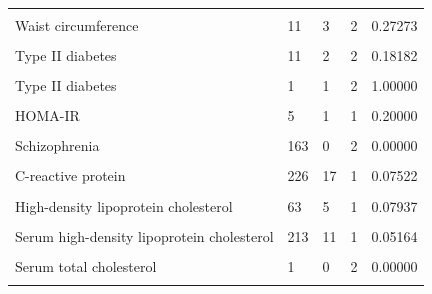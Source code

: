 \documentclass[11pt,oneside]{bristolthesis}
\begin{document}
\begin{table}
{\begin{tabular}[t]{lllll}
\cellcolor{gray!6}{Waist circumference} & \cellcolor{gray!6}{172} & \cellcolor{gray!6}{6} & \cellcolor{gray!6}{2} & \cellcolor{gray!6}{0.03488}\\
Waist circumference & 11 & 3 & 2 & 0.27273\\
\cellcolor{gray!6}{Waist circumference} & \cellcolor{gray!6}{2} & \cellcolor{gray!6}{1} & \cellcolor{gray!6}{2} & \cellcolor{gray!6}{0.50000}\\
\addlinespace
Type II diabetes & 11 & 2 & 2 & 0.18182\\
\cellcolor{gray!6}{Type II diabetes} & \cellcolor{gray!6}{6} & \cellcolor{gray!6}{0} & \cellcolor{gray!6}{2} & \cellcolor{gray!6}{0.00000}\\
Type II diabetes & 1 & 1 & 2 & 1.00000\\
\cellcolor{gray!6}{HOMA-IR} & \cellcolor{gray!6}{1} & \cellcolor{gray!6}{1} & \cellcolor{gray!6}{1} & \cellcolor{gray!6}{1.00000}\\
HOMA-IR & 5 & 1 & 1 & 0.20000\\
\addlinespace
\cellcolor{gray!6}{Schizophrenia} & \cellcolor{gray!6}{3} & \cellcolor{gray!6}{0} & \cellcolor{gray!6}{2} & \cellcolor{gray!6}{0.00000}\\
Schizophrenia & 163 & 0 & 2 & 0.00000\\
\cellcolor{gray!6}{C-reactive protein} & \cellcolor{gray!6}{3} & \cellcolor{gray!6}{3} & \cellcolor{gray!6}{1} & \cellcolor{gray!6}{1.00000}\\
C-reactive protein & 226 & 17 & 1 & 0.07522\\
\cellcolor{gray!6}{High-density lipoprotein cholesterol} & \cellcolor{gray!6}{2} & \cellcolor{gray!6}{2} & \cellcolor{gray!6}{1} & \cellcolor{gray!6}{1.00000}\\
\addlinespace
High-density lipoprotein cholesterol & 63 & 5 & 1 & 0.07937\\
\cellcolor{gray!6}{Serum high-density lipoprotein cholesterol} & \cellcolor{gray!6}{22} & \cellcolor{gray!6}{17} & \cellcolor{gray!6}{1} & \cellcolor{gray!6}{0.77273}\\
Serum high-density lipoprotein cholesterol & 213 & 11 & 1 & 0.05164\\
\cellcolor{gray!6}{Serum low-density lipoprotein cholesterol} & \cellcolor{gray!6}{61} & \cellcolor{gray!6}{0} & \cellcolor{gray!6}{1} & \cellcolor{gray!6}{0.00000}\\
Serum total cholesterol & 1 & 0 & 2 & \vphantom{1}0.00000\\
\addlinespace
\cellcolor{gray!6}{Serum total cholesterol} & \cellcolor{gray!6}{111} & \cellcolor{gray!6}{0} & \cellcolor{gray!6}{2} & \cellcolor{gray!6}{0.00000}\\

\end{tabular}}
\end{table}
\end{document}
